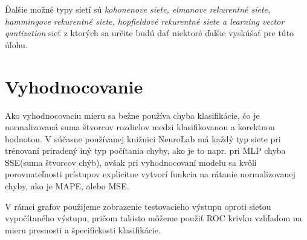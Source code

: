 \documentclass{iitsrc}
\begin{document}
\begin{multicols}{2}
Ďalšie možné typy sietí sú \emph{kohonenove siete, elmanove rekurentné siete, hammingove rekurentné siete, hopfieldové rekurentné siete a learning vector qantization} sieť z ktorých sa určite budú dať niektoré ďalšie vyskúšať pre túto úlohu.

\section{Vyhodnocovanie}
Ako vyhodnocovaciu mieru sa bežne používa chyba klasifikácie, čo je normalizovaná suma štvorcov rozdielov medzi klasifikovanou a korektnou hodnotou. V súčasne používanej knižnici NeuroLab má každý typ siete pri trénovaní priradený iný typ počítania chyby, ako je to napr. pri MLP chyba SSE(suma štvorcov chýb), avšak pri vyhodnocovaní modelu sa kvôli porovnateľnosti prístupov explicitne vytvorí funkcia na rátanie normalizovanej chyby, ako je MAPE, alebo MSE.

V rámci grafov použijeme zobrazenie testovacieho výstupu oproti sieťou vypočítaného výstupu, pričom takisto môžeme použiť ROC krivku vzhľadom na mieru presnosti a špecifickosti klasifikácie.

\let\OLDthebibliography\thebibliography
\renewcommand\thebibliography[1]{
  \OLDthebibliography{#1}
  \setlength{\parskip}{5pt}
 \footnotesize
}




\end{multicols}
\end{document}
